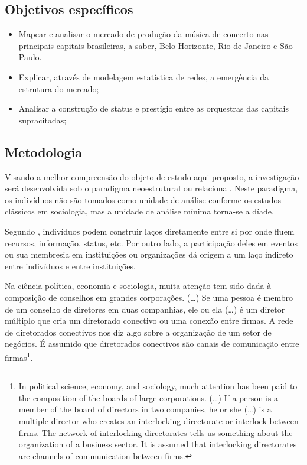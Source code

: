 \documentclass[a4paper, 12pt, openright, oneside, german, french, english, brazil]{abntex2}
\begin{document}
	\subsection*{Objetivos específicos}
	
	\begin{itemize}
		\item Mapear e analisar o mercado de produção da música de concerto nas principais capitais brasileiras, a saber, Belo Horizonte, Rio de Janeiro e São Paulo.
		\item Explicar, através de modelagem estatística de redes, a emergência da estrutura do mercado;
		\item Analisar a construção de status e prestígio entre as orquestras das capitais supracitadas;
	\end{itemize}
	
	\subsection*{Metodologia}
	
	Visando a melhor compreensão do objeto de estudo aqui proposto, a investigação será desenvolvida sob o paradigma neoestrutural ou relacional. Neste paradigma, os indivíduos não são tomados como unidade de análise conforme os estudos clássicos em sociologia, mas a unidade de análise mínima torna-se a díade.
	
	Segundo , indivíduos podem construir laços diretamente entre si por onde fluem recursos, informação, status, etc. Por outro lado, a participação deles em eventos ou sua membresia em instituições ou organizações dá origem a um laço indireto entre indivíduos e entre instituições.
	
	\begin{citacao}
		Na ciência política, economia e sociologia, muita atenção tem sido dada à composição de conselhos em grandes corporações. (\dots) Se uma pessoa é membro de um conselho de diretores em duas companhias, ele ou ela (\dots) é um diretor múltiplo que cria um diretorado conectivo ou uma conexão entre firmas. A rede de diretorados conectivos nos diz algo sobre a organização de um setor de negócios. É assumido que diretorados conectivos são canais de comunicação entre firmas\footnote{In political science, economy, and sociology, much attention has been paid to the composition of the boards of large corporations. (\dots) If a person is a member of the board of directors in two companies, he or she (\dots) is a multiple director who creates an interlocking directorate or interlock between firms. The network of interlocking directorates tells us something about the organization of a business sector. It is assumed that interlocking directorates are channels of communication between firms.}. \cite[p. 117]{denooy2011exploratory}
	\end{citacao}
	
\end{document}
